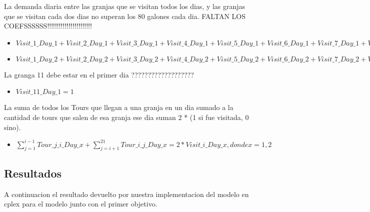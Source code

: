 La demanda diaria entre las granjas que se visitan todos los dias, y las granjas que se visitan cada dos dias no superan los 80 galones cada dia.
FALTAN LOS COEFSSSSSS!!!!!!!!!!!!!!!!!!!!!!! \\
\begin{itemize}
\item $Visit\_1\_Day\_1 + Visit\_2\_Day\_1 + Visit\_3\_Day\_1 + Visit\_4\_Day\_1 + Visit\_5\_Day\_1 + Visit\_6\_Day\_1 + Visit\_7\_Day\_1 + Visit\_8\_Day\_1 + Visit\_9\_Day\_1 + Visit\_10\_Day\_1 + Visit\_11\_Day\_1 + Visit\_12\_Day\_1 + Visit\_13\_Day\_1 + Visit\_14\_Day\_1 + Visit\_15\_Day\_1 + Visit\_16\_Day\_1 + Visit\_17\_Day\_1 + Visit\_18\_Day\_1 + Visit\_19\_Day\_1 + Visit\_20\_Day\_1 + Visit\_21\_Day\_1 \leq 80$ \\
\item $Visit\_1\_Day\_2 + Visit\_2\_Day\_2 + Visit\_3\_Day\_2 + Visit\_4\_Day\_2 + Visit\_5\_Day\_2 + Visit\_6\_Day\_2 + Visit\_7\_Day\_2 + Visit\_8\_Day\_2 + Visit\_9\_Day\_2 + Visit\_10\_Day\_2 + Visit\_11\_Day\_2 + Visit\_12\_Day\_2 + Visit\_13\_Day\_2 + Visit\_14\_Day\_2 + Visit\_15\_Day\_2 + Visit\_16\_Day\_2 + Visit\_17\_Day\_2 + Visit\_18\_Day\_2 + Visit\_19\_Day\_2 + Visit\_20\_Day\_2 + Visit\_21\_Day\_2 \leq 80$ \\ 
\end{itemize}


La granga 11 debe estar en el primer dia ??????????????????? \\
\begin{itemize}
\item $ Visit\_11\_Day\_1 = 1$ \\
\end{itemize}

La suma de todos los Tours que llegan a una granja en un dia sumado a la cantidad de tours que salen de esa granja ese dia suman 2 * (1 si fue visitada, 0 sino).

\begin{itemize}
\item $ \sum_{j = 1}^{i-1} Tour\_j\_i\_Day\_x + \sum_{j=i+1}^{21} Tour\_i\_j\_Day\_x = 2 * Visit\_i\_Day\_x            , donde	x = 1,2 $\\
\end{itemize}




\subsection{Resultados}

A continuacion el resultado devuelto por nuestra implementacion del modelo en cplex para el modelo junto con el primer objetivo.\\


